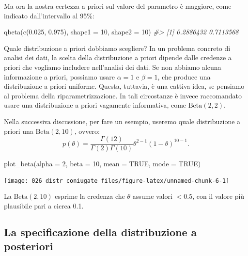 \documentclass[
  11pt,
  italian,
  a4paper,
  extrafontsizes,onecolumn,openright
  ]{memoir}
\newenvironment{Shaded}{\begin{snugshade}}{\end{snugshade}}
\newcommand{\AttributeTok}[1]{\textcolor[rgb]{0.77,0.63,0.00}{#1}}
\newcommand{\CommentTok}[1]{\textcolor[rgb]{0.56,0.35,0.01}{\textit{#1}}}
\newcommand{\ConstantTok}[1]{\textcolor[rgb]{0.00,0.00,0.00}{#1}}
\newcommand{\DecValTok}[1]{\textcolor[rgb]{0.00,0.00,0.81}{#1}}
\newcommand{\FloatTok}[1]{\textcolor[rgb]{0.00,0.00,0.81}{#1}}
\newcommand{\FunctionTok}[1]{\textcolor[rgb]{0.00,0.00,0.00}{#1}}
\newcommand{\NormalTok}[1]{#1}
\theoremstyle{definition}
\theoremstyle{definition}
\theoremstyle{definition}
\theoremstyle{definition}
\theoremstyle{remark}
\begin{document}
Ma ora la nostra certezza a priori sul valore del parametro è maggiore, come indicato dall'intervallo al 95\%:

\begin{Shaded}
\begin{Highlighting}[]
\FunctionTok{qbeta}\NormalTok{(}\FunctionTok{c}\NormalTok{(}\FloatTok{0.025}\NormalTok{, }\FloatTok{0.975}\NormalTok{), }\AttributeTok{shape1 =} \DecValTok{10}\NormalTok{, }\AttributeTok{shape2 =} \DecValTok{10}\NormalTok{)}
\CommentTok{\#\textgreater{} [1] 0.2886432 0.7113568}
\end{Highlighting}
\end{Shaded}

Quale distribuzione a priori dobbiamo scegliere? In un problema concreto di analisi dei dati, la scelta della distribuzione a priori dipende dalle credenze a priori che vogliamo includere nell'analisi dei dati. Se non abbiamo alcuna informazione a priori, possiamo usare \(\alpha=1\) e \(\beta=1\), che produce una distribuzione a priori uniforme. Questa, tuttavia, è una cattiva idea, se pensiamo al problema della riparametrizzazione. In tali circostanze è invece raccomandato usare una distribuzione a priori vagamente informativa, come \(\text{Beta}(2, 2)\).

Nella successiva discussione, per fare un esempio, useremo quale distribuzione a priori una \(\mbox{Beta}(2, 10)\), ovvero:
\[
p(\theta) = \frac{\Gamma(12)}{\Gamma(2)\Gamma(10)}\theta^{2-1} (1-\theta)^{10-1}.
\]

\begin{Shaded}
\begin{Highlighting}[]
\FunctionTok{plot\_beta}\NormalTok{(}\AttributeTok{alpha =} \DecValTok{2}\NormalTok{, }\AttributeTok{beta =} \DecValTok{10}\NormalTok{, }\AttributeTok{mean =} \ConstantTok{TRUE}\NormalTok{, }\AttributeTok{mode =} \ConstantTok{TRUE}\NormalTok{)}
\end{Highlighting}
\end{Shaded}

\begin{center}\texttt{[image: 026\_distr\_coniugate\_files/figure-latex/unnamed-chunk-6-1]} \end{center}

La \(\mbox{Beta}(2, 10)\) esprime la credenza che \(\theta\) assume valori \(< 0.5\), con il valore più plausibile pari a cicrca 0.1.

\hypertarget{la-specificazione-della-distribuzione-a-posteriori}{%
\subsection{La specificazione della distribuzione a posteriori}\label{la-specificazione-della-distribuzione-a-posteriori}}
\end{document}
